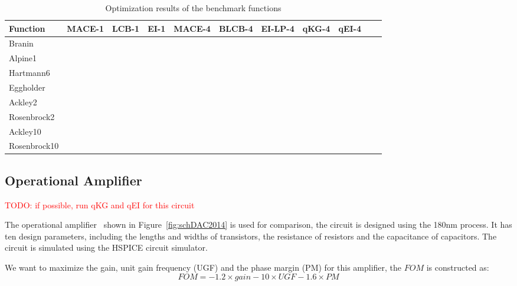 \begin{table}[tp]
    \centering
    \caption{Optimization results of the benchmark functions}
    \label{tab:result_analytical}
    \begin{tabular}{lllllllllll}
        \toprule
        Function           & MACE-1 & LCB-1  & EI-1  & MACE-4  & BLCB-4  & EI-LP-4 & qKG-4 & qEI-4  \\ \midrule
         Branin            &        &        &       &         &         &         &       &        \\
         Alpine1           &        &        &       &         &         &         &       &        \\
         Hartmann6         &        &        &       &         &         &         &       &        \\
         Eggholder         &        &        &       &         &         &         &       &        \\
         Ackley2           &        &        &       &         &         &         &       &        \\
         Rosenbrock2       &        &        &       &         &         &         &       &        \\
         Ackley10          &        &        &       &         &         &         &       &        \\
         Rosenbrock10      &        &        &       &         &         &         &       &        \\
        \bottomrule
    \end{tabular}
\end{table}

\subsection{Operational Amplifier}


\textcolor{red}{TODO: if possible, run qKG and qEI for this circuit}

The operational amplifier~\cite{wang2014enabling} shown in
Figure~\ref{fig:schDAC2014} is used for comparison, the circuit is designed
using the 180nm process. It has ten design parameters, including the lengths
and widths of transistors, the resistance of resistors and the capacitance of
capacitors. The circuit is simulated using the HSPICE circuit simulator.

We want to maximize the gain, unit gain frequency (UGF) and the phase margin (PM) for this amplifier, the $FOM$ is constructed as:
$$
\mathit{FOM} = -1.2 \times \mathit{gain} - 10 \times \mathit{UGF} - 1.6 \times \mathit{PM}
$$

